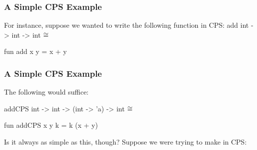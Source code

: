 \documentclass[aspectratio=169, handout]{beamer}
\begin{document}
\begin{comment}
\begin{frame}[fragile]
  \frametitle{Continuation-Passing Type Signatures}

  We see that this transformation witnesses the fact that the \code{|>} operator
  is just the identity function, equipped with a continuation.

  \pause
  \vspace{\fill}

  Consider the following function:
  \begin{codeblock}
    fun identity (x : 'a) : 'a = x
  \end{codeblock}

  \pause
  \vspace{\fill}

  What if we throw a continuation in there?

  \pause
  \vspace{\fill}

  \begin{codeblock}
    fun identityCPS (x : 'a) (k : 'a -> 'b): 'b = k x

    infix |>
    fun x |> f = identityCPS x f
  \end{codeblock}
\end{frame}
\end{comment}

\begin{frame}[fragile]
  \frametitle{A Simple CPS Example}

  For instance, suppose we wanted to write the following function in CPS:
  \spec
    {add}
    {int -> int -> int}
    {}
    { $\cong$ }

  \pause
  \vspace{\fill}

  \begin{codeblock}
    fun add x y = x + y
  \end{codeblock}
\end{frame}

\begin{frame}[fragile]
  \frametitle{A Simple CPS Example}

  The following would suffice:

  \spec
    {addCPS}
    {int -> int -> (int -> 'a) -> int}
    {}
    { $\cong$ }

  \pause
  \vspace{\fill}

  \begin{codeblock}
    fun addCPS x y k = k (x + y)
  \end{codeblock}

  \pause
  \vspace{\fill}

  Is it always as simple as this, though? Suppose we were trying to
  make  in CPS:
\end{frame}
\end{document}
